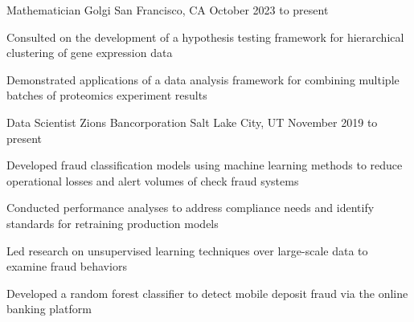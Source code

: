

\begin{cventries}

  \cventry
    {Mathematician} %
    {Golgi} %
    {San Francisco, CA} %
    {October 2023 to present} %
    {
      \begin{cvitems} %
        \item {Consulted on the development of a hypothesis testing framework for hierarchical clustering of gene expression data}
        \item {Demonstrated applications of a data analysis framework for combining multiple batches of proteomics experiment results}
      \end{cvitems}
    }

  \cventry
    {Data Scientist} %
    {Zions Bancorporation} %
    {Salt Lake City, UT} %
    {November 2019 to present} %
    {
      \begin{cvitems} %
        \item {Developed fraud classification models using machine learning methods to reduce operational losses and alert volumes of check fraud systems}
        \item {Conducted performance analyses to address compliance needs and identify standards for retraining production models}
        \item {Led research on unsupervised learning techniques over large-scale data to examine fraud behaviors}
        \item {Developed a random forest classifier to detect mobile deposit fraud via the online banking platform}
      \end{cvitems}
    }


\end{cventries}
